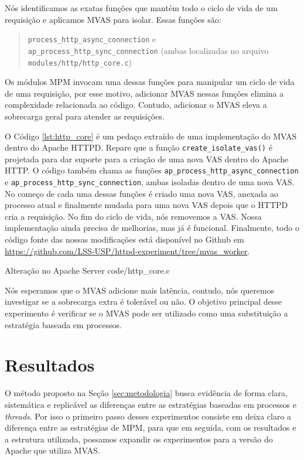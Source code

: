 Nós identificamos as exatas funções que mantém todo o ciclo de vida de um
requisição e aplicamos MVAS para isolar. Essas funções são:

\begin{quote}
  \texttt{process\_http\_async\_connection} e\\
  \texttt{ap\_process\_http\_sync\_connection} (ambas localizadas no arquivo
  \texttt{modules/http/http\_core.c})
\end{quote}

Os módulos MPM invocam uma dessas funções para manipular um ciclo de vida de
uma requisição, por esse motivo, adicionar MVAS nessas funções elimina a
complexidade relacionada ao código. Contudo, adicionar o MVAS eleva a
sobrecarga geral para atender as requisições.

O Código \ref{lst:http_core} é um pedaço extraído de uma implementação do MVAS
dentro do Apache HTTPD. Repare que a função \texttt{create\_isolate\_vas()} é
projetada para dar suporte para a criação de uma nova VAS dentro do Apache
HTTP. O código também chama as funções
\texttt{ap\_process\_http\_async\_connection} e
\texttt{ap\_process\_http\_sync\_connection}, ambas isoladas dentro de uma nova
VAS. No começo de cada uma dessas funções é criado uma nova VAS, anexada ao
processo atual e finalmente mudada para uma nova VAS depois que o HTTPD cria a
requisição. No fim do ciclo de vida, nós removemos a VAS. Nossa implementação
ainda precisa de melhorias, mas já é funcional. Finalmente, todo o código fonte
das nossas modificações está disponível no Github em
\url{https://github.com/LSS-USP/httpd-experiment/tree/mvas\_worker}.

\begin{ruledcaption}{Alteração no Apache Server\label{lst:http_core}}
 {code/http_core.c}
\end{ruledcaption}

Nós esperamos que o MVAS adicione mais latência, contudo, nós queremos
investigar se a sobrecarga extra é tolerável ou não. O objetivo principal desse
experimento é verificar se o MVAS pode ser utilizado como uma substituição a
estratégia baseada em processos.

\section{Resultados}
\label{sec:preliminary}

O método proposto na Seção \ref{sec:metodologia} busca evidência de forma
clara, sistemática e replicável as diferenças entre as estratégias baseadas em
processos e \emph{threads}. Por isso o primeiro passo desses experimentos consiste em
deixa claro a diferença entre as estratégias de MPM, para que em seguida, com
os resultados e a estrutura utilizada, possamos expandir os experimentos para a
versão do Apache que utiliza MVAS.

